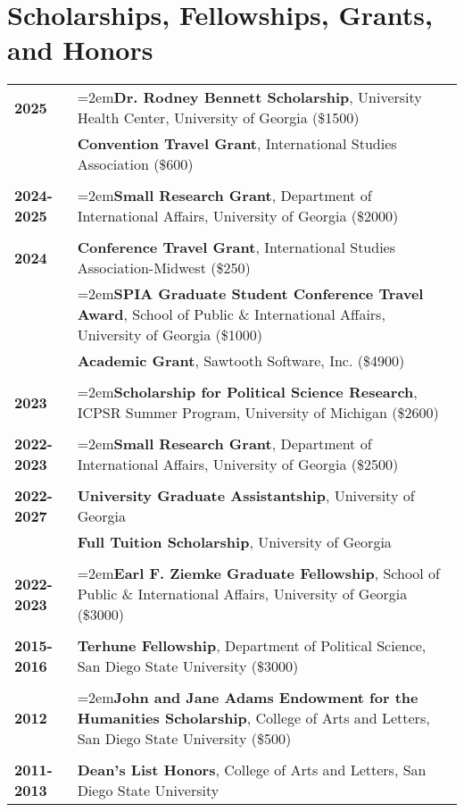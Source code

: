\documentclass[letterpaper,12pt]{article}
\begin{document}
\section{Scholarships, Fellowships, Grants, and Honors}
\begin{xltabular}{\dimexpr\textwidth-0in}{p{.85in}X}
\textbf{2025}          & \hangindent=2em\textbf{Dr. Rodney Bennett Scholarship}, University Health Center, University of Georgia (\$1500)\\
                              & \textbf{Convention Travel Grant}, International Studies Association (\$600)\\ \\
\textbf{2024-2025} & \hangindent=2em\textbf{Small Research Grant}, Department of International Affairs, University of Georgia (\$2000)\\ \\
\textbf{2024}          & \textbf{Conference Travel Grant}, International Studies Association-Midwest (\$250)\\
                              & \hangindent=2em\textbf{SPIA Graduate Student Conference Travel Award}, School of Public \& \mbox{International} Affairs, University of Georgia (\$1000)\\
                              & \textbf{Academic Grant}, Sawtooth Software, Inc. (\$4900)\\ \\
\textbf{2023}          & \hangindent=2em\textbf{Scholarship for Political Science Research}, ICPSR Summer Program, University of \mbox{Michigan} (\$2600)\\ \\
\textbf{2022-2023} & \hangindent=2em\textbf{Small Research Grant}, Department of International Affairs, University of Georgia (\$2500)\\ \\
\textbf{2022-2027} & \textbf{University Graduate Assistantship}, University of Georgia\\
                              & \textbf{Full Tuition Scholarship}, University of Georgia\\ \\
\textbf{2022-2023} & \hangindent=2em\textbf{Earl F. Ziemke Graduate Fellowship}, School of Public \& International Affairs, \mbox{University} of Georgia (\$3000)\\ \\
\textbf{2015-2016} & \textbf{Terhune Fellowship}, Department of Political Science, San Diego State University (\$3000)\\ \\
\textbf{2012}          & \hangindent=2em\textbf{John and Jane Adams Endowment for the Humanities Scholarship}, College of Arts and Letters, San Diego State University (\$500)\\ \\
\textbf{2011-2013} & \textbf{Dean's List Honors}, College of Arts and Letters, San Diego State University
\end{xltabular}
\end{document}
